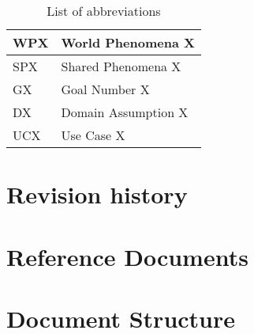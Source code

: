 \begin{table}[H]
  \begin{tabular}{|l|l|}

    \hline
    WPX & World Phenomena X    \\
    \hline
    SPX & Shared Phenomena X    \\
    \hline
    GX & Goal Number X    \\
    \hline
    DX & Domain Assumption X    \\
    \hline
    UCX & Use Case X    \\
    \hline

  \end{tabular}
  \caption{List of abbreviations}
  \label{tab:abbreviations}
\end{table}



\section{Revision history}
\label{s:Revision_history}%


\section{Reference Documents}
\label{s:Reference_documents}%

\section{Document Structure}
\label{s:Document_Structure}%
